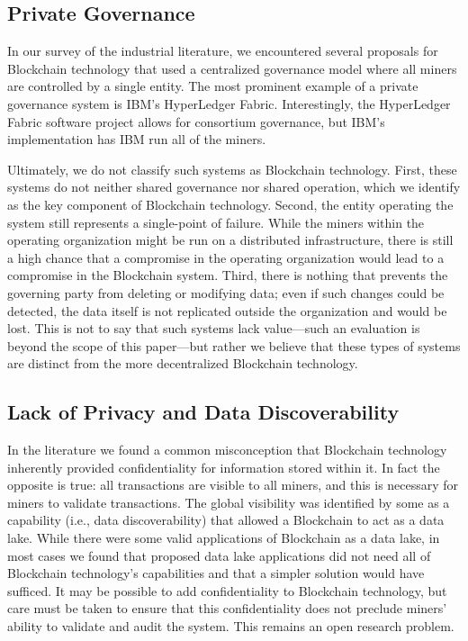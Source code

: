 \subsection{Private Governance}
\label{sec:private-blockchain}
In our survey of the industrial literature, we encountered several proposals for Blockchain technology that used a centralized governance model where all miners are controlled by a single entity.
The most prominent example of a private governance system is IBM's HyperLedger Fabric.
Interestingly, the HyperLedger Fabric software project allows for consortium governance, but IBM's implementation has IBM run all of the miners.

Ultimately, we do not classify such systems as Blockchain technology.
First, these systems do not neither shared governance nor shared operation, which we identify as the key component of Blockchain technology.
Second, the entity operating the system still represents a single-point of failure.
While the miners within the operating organization might be run on a distributed infrastructure, there is still a high chance that a compromise in the operating organization would lead to a compromise in the Blockchain system.
Third, there is nothing that prevents the governing party from deleting or modifying data; even if such changes could be detected, the data itself is not replicated outside the organization and would be lost.
This is not to say that such systems lack value---such an evaluation is beyond the scope of this paper---but rather we believe that these types of systems are distinct from the more decentralized Blockchain technology.

\subsection{Lack of Privacy and Data Discoverability}
In the literature we found a common misconception that Blockchain technology inherently provided confidentiality for information stored within it.
In fact the opposite is true: all transactions are visible to all miners, and this is necessary for miners to validate transactions.
The global visibility was identified by some as a capability (i.e., data discoverability) that allowed a Blockchain to act as a data lake.
While there were some valid applications of Blockchain as a data lake, in most cases we found that proposed data lake applications did not need all of Blockchain technology's capabilities and that a simpler solution would have sufficed.
It may be possible to add confidentiality to Blockchain technology, but care must be taken to ensure that this confidentiality does not preclude miners' ability to validate and audit the system.
This remains an open research problem.

